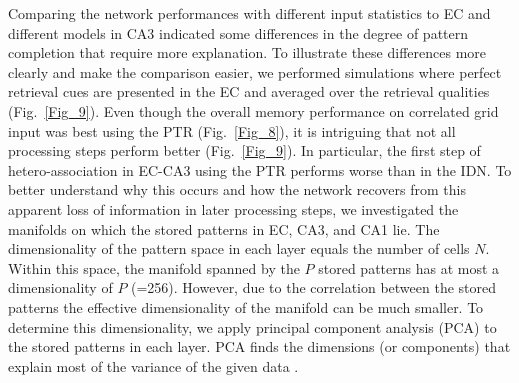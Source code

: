 \documentclass[utf8]{frontiersSCNS} %
\begin{document}
Comparing the network performances with different input statistics to EC and different models in CA3 indicated some differences in the degree of pattern completion that require more explanation. To illustrate these differences more clearly and make the comparison easier, we performed simulations where perfect retrieval cues are presented in the EC and averaged over the retrieval qualities (Fig.~\ref{Fig_9}).  
%
Even though the overall memory performance on correlated grid input was best using the PTR (Fig.~\ref{Fig_8}), it is intriguing that not all processing steps perform better (Fig.~\ref{Fig_9}). In particular, the first step of hetero-association in EC-CA3 using the PTR performs worse than in the IDN.
%
To better understand why this occurs and how the network recovers from this apparent loss of information in later processing steps, we investigated the manifolds on which the stored patterns in EC, CA3, and CA1 lie. The dimensionality of the pattern space in each layer equals the number of cells $N$. Within this space, the manifold spanned by the $P$ stored patterns has at most a dimensionality of $P$ (=256). However, due to the correlation between the stored patterns the effective dimensionality of the manifold can be much smaller. To determine this dimensionality, we apply principal component analysis (PCA) to the stored patterns in each layer. PCA finds the dimensions (or components) that explain most of the variance of the given data \cite[chapter 4]{Hastie2009}. 
\end{document}
